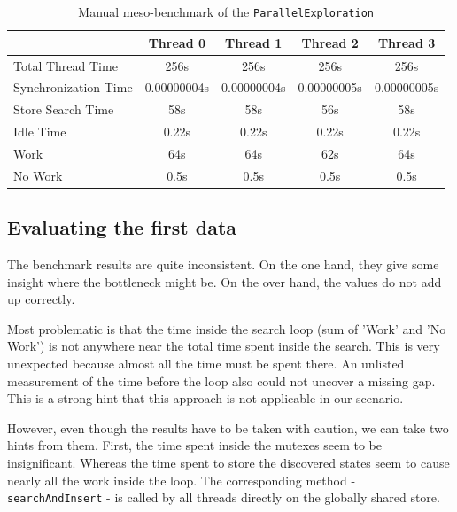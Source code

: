 \begin{center}
    \begin{table}[H]
        \centering
        \begin{tabular}{ | l | c | c | c | c |}
            \hline
            \textbf{} & \textbf{Thread 0} & \textbf{Thread 1} & \textbf{Thread 2} & \textbf{Thread 3}\\ \hline
            Total Thread Time & 256s & 256s & 256s & 256s \\ 
            Synchronization Time & 0.00000004s & 0.00000004s & 0.00000005s & 0.00000005s \\
            Store Search Time & 58s & 58s & 56s & 58s \\ 
            Idle Time & 0.22s & 0.22s & 0.22s & 0.22s \\ 
            Work & 64s & 64s & 62s & 64s \\ 
            No Work & 0.5s & 0.5s & 0.5s & 0.5s \\ \hline
        \end{tabular}
        \caption{Manual meso-benchmark of the \texttt{ParallelExploration}}
        \label{ManualBenchmark}
    \end{table}
\end{center}

\subsection{Evaluating the first data}
The benchmark results are quite inconsistent. On the one hand, they give some insight where the bottleneck might be. On the over hand, the values do not add up correctly.

Most problematic is that the time inside the search loop (sum of 'Work' and 'No Work') is not anywhere near the total time spent inside the search. This is very unexpected because almost all the time must be spent there. An unlisted measurement of the time before the loop also could not uncover a missing gap. This is a strong hint that this approach is not applicable in our scenario.

However, even though the results have to be taken with caution, we can take two hints from them. First, the time spent inside the mutexes seem to be insignificant. Whereas the time spent to store the discovered states seem to cause nearly all the work inside the loop. The corresponding method - \texttt{searchAndInsert} - is called by all threads directly on the globally shared store.

